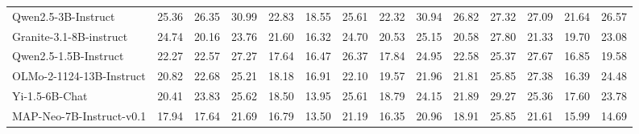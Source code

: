 {\begin{table}[p]
{\begin{tabular}{lccccccccccccc}
\rowcolor{color22}
Qwen2.5-3B-Instruct& 25.36& 26.35& 30.99& 22.83& 18.55& 25.61& 22.32& 30.94& 26.82& 27.32& 27.09& 21.64& 26.57 \\
\rowcolor{color22}
Granite-3.1-8B-instruct& 24.74& 20.16& 23.76& 21.60& 16.32& 24.70& 20.53& 25.15& 20.58& 27.80& 21.33& 19.70& 23.08 \\
\rowcolor{color22}
Qwen2.5-1.5B-Instruct& 22.27& 22.57& 27.27& 17.64& 16.47& 26.37& 17.84& 24.95& 22.58& 25.37& 27.67& 16.85& 19.58 \\
\rowcolor{color22}
OLMo-2-1124-13B-Instruct& 20.82& 22.68& 25.21& 18.18& 16.91& 22.10& 19.57& 21.96& 21.81& 25.85& 27.38& 16.39& 24.48 \\
\rowcolor{color22}
Yi-1.5-6B-Chat& 20.41& 23.83& 25.62& 18.50& 13.95& 25.61& 18.79& 24.15& 21.89& 29.27& 25.36& 17.60& 23.78 \\
\rowcolor{color22}
MAP-Neo-7B-Instruct-v0.1& 17.94& 17.64& 21.69& 16.79& 13.50& 21.19& 16.35& 20.96& 18.91& 25.85& 21.61& 15.99& 14.69 \\

\end{tabular}}
\end{table}}
